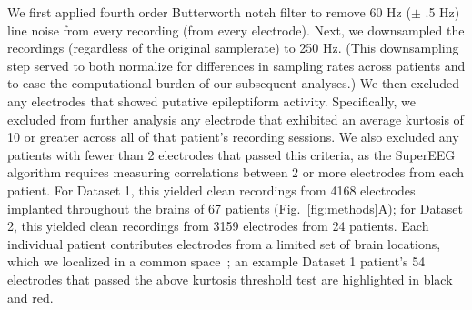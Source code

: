 \documentclass[11pt]{article}
\begin{document}
We first applied fourth order Butterworth notch filter to remove 60 Hz
($\pm$ .5 Hz) line noise from every recording (from every electrode).
Next, we downsampled the recordings (regardless of the original
samplerate) to 250 Hz.  (This downsampling step served to both
normalize for differences in sampling rates across patients and to
ease the computational burden of our subsequent analyses.)  We then
excluded any electrodes that showed putative epileptiform activity.
Specifically, we excluded from further analysis any electrode that
exhibited an average kurtosis of 10 or greater across all of that
patient's recording sessions.  We also excluded any patients with
fewer than 2 electrodes that passed this criteria, as the SuperEEG
algorithm requires measuring correlations between 2 or more electrodes
from each patient.  For Dataset 1, this yielded clean recordings from
4168 electrodes implanted throughout the brains of 67 patients
(Fig.~\ref{fig:methods}A); for Dataset 2, this yielded clean
recordings from 3159 electrodes from 24 patients.  Each individual
patient contributes electrodes from a limited set of brain locations,
which we localized in a common space~\citep[MNI152;][]{GrabEtal06}; an
example Dataset 1 patient's 54 electrodes that passed the above
kurtosis threshold test are highlighted in black and red.
\end{document}
